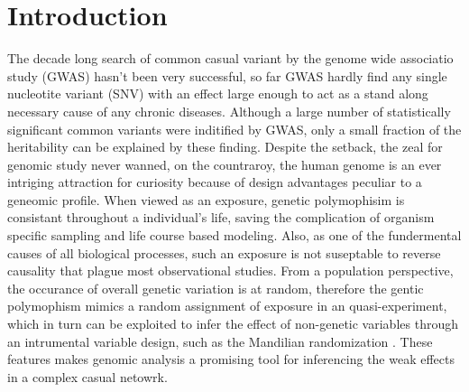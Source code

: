 \documentclass[twocolumn]{article}
\begin{document}
\section{Introduction}
The decade long search of common casual variant by the genome wide associatio study (GWAS) hasn't been very successful, so far GWAS hardly find any single nucleotite variant (SNV) with an effect large enough to act as a stand along necessary cause of any chronic diseases. Although a large number of statistically significant common variants were inditified by GWAS, only a small fraction of the heritability can be explained by these finding\cite{GWAS1, GWAS2}. Despite the setback, the zeal for genomic study never wanned, on the countraroy, the human genome is an ever intriging attraction for curiosity because of design advantages peculiar to a geneomic profile. When viewed as an exposure, genetic polymophisim is consistant throughout a individual's life, saving the complication of organism specific sampling and life course based modeling. Also, as one of the fundermental causes of all biological processes, such an exposure is not suseptable to reverse causality that plague most observational studies. From a population perspective, the occurance of overall genetic variation is at random, therefore the gentic polymophism mimics a random assignment of exposure in an quasi-experiment, which in turn can be exploited to infer the effect of non-genetic variables through an intrumental variable design, such as the Mandilian randomization \cite{MR1}. These features makes genomic analysis a promising tool for inferencing the weak effects in a complex casual netowrk.
\end{document}
